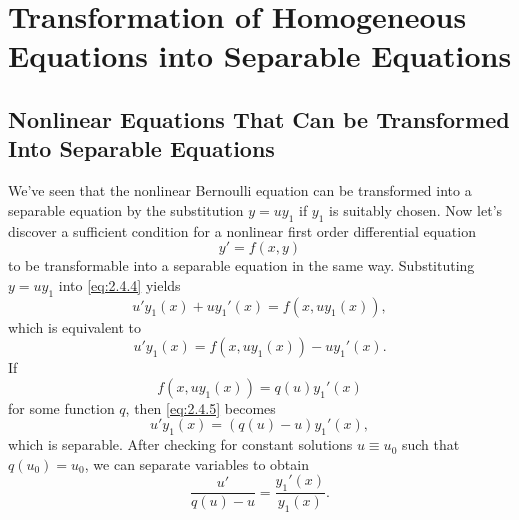 \documentclass{ximera}
\begin{document}





\section*{Transformation of Homogeneous Equations into Separable Equations}
\subsection*{Nonlinear Equations That Can be  Transformed Into Separable Equations}

We've seen that the nonlinear Bernoulli equation can be transformed
into a separable equation by  the substitution $y=uy_1$ if
$y_1$ is suitably chosen. Now let's discover a sufficient condition
for a nonlinear first order differential equation
\begin{equation} \label{eq:2.4.4}
y'=f(x,y)
\end{equation}
to be transformable into a separable equation in the same way.
  Substituting $y=uy_1$  into
\eqref{eq:2.4.4} yields
$$
u'y_1(x)+uy_1'(x)=f(x,uy_1(x)),
$$
which is equivalent to
\begin{equation} \label{eq:2.4.5}
u'y_1(x)=f(x,uy_1(x))-uy_1'(x).
\end{equation}
If
$$
f(x,uy_1(x))=q(u)y_1'(x)
$$
for some function $q$, then   \eqref{eq:2.4.5} becomes
\begin{equation} \label{eq:2.4.6}
u'y_1(x)=(q(u)-u)y_1'(x),
\end{equation}
which is separable. After checking for constant solutions $u\equiv
u_0$ such that $q(u_0)=u_0$, we can separate
variables to obtain
$$
\frac{u'}{q(u)-u}=\frac{y_1'(x)}{y_1(x)}.
$$
\end{document}
